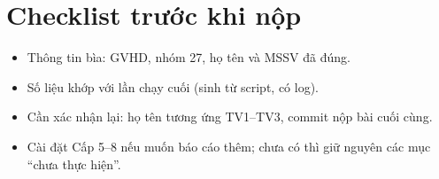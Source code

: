 \documentclass[13pt,a4paper]{extreport}
\begin{document}
\chapter{Checklist trước khi nộp}
\begin{itemize}[label=$\square$]
\item Thông tin bìa: GVHD, nhóm 27, họ tên và MSSV đã đúng.
\item Số liệu khớp với lần chạy cuối (sinh từ script, có log).
\item Cần xác nhận lại: họ tên tương ứng TV1--TV3, commit nộp bài cuối cùng.
\item Cài đặt Cấp 5--8 nếu muốn báo cáo thêm; chưa có thì giữ nguyên các mục ``chưa thực hiện''.
\end{itemize}
\end{document}

